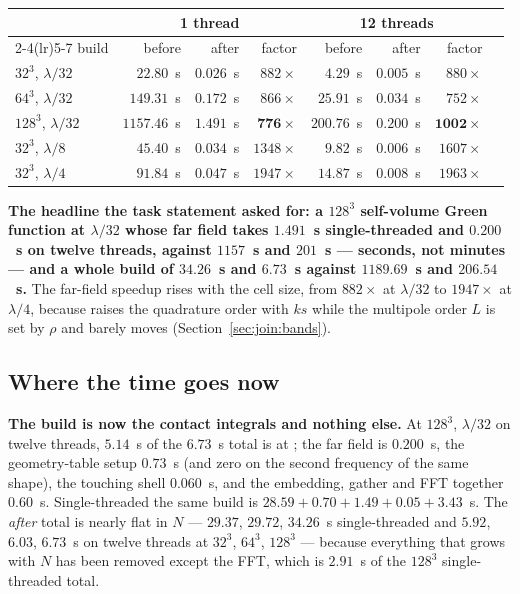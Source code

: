 \begin{center}\footnotesize
\begin{tabular}{@{}lrrrrrrr@{}}
\toprule
& \multicolumn{3}{c}{1 thread} & \multicolumn{3}{c}{12 threads}\\
\cmidrule(lr){2-4}\cmidrule(lr){5-7}
build & before & after & factor & before & after & factor\\
\midrule
$32^3$, $\lambda/32$ & $22.80$~s & $0.026$~s & $882\times$ &
$4.29$~s & $0.005$~s & $880\times$\\
$64^3$, $\lambda/32$ & $149.31$~s & $0.172$~s & $866\times$ &
$25.91$~s & $0.034$~s & $752\times$\\
$128^3$, $\lambda/32$ & $1157.46$~s & $1.491$~s & $\mathbf{776\times}$ &
$200.76$~s & $0.200$~s & $\mathbf{1002\times}$\\
$32^3$, $\lambda/8$ & $45.40$~s & $0.034$~s & $1348\times$ &
$9.82$~s & $0.006$~s & $1607\times$\\
$32^3$, $\lambda/4$ & $91.84$~s & $0.047$~s & $1947\times$ &
$14.87$~s & $0.008$~s & $1963\times$\\
\bottomrule
\end{tabular}
\end{center}

\noindent
\textbf{The headline the task statement asked for: a $128^3$ self-volume Green function at
$\lambda/32$ whose far field takes $1.491$~s single-threaded and $0.200$~s on twelve
threads, against $1157$~s and $201$~s --- seconds, not minutes --- and a whole build of
$34.26$~s and $6.73$~s against $1189.69$~s and $206.54$~s.} The far-field speedup rises
with the cell size, from $882\times$ at $\lambda/32$ to $1947\times$ at $\lambda/4$,
because  raises the quadrature order with $ks$ while the multipole order $L$
is set by $\rho$ and barely moves (Section~\ref{sec:join:bands}).

\subsection{Where the time goes now}
\label{sec:bch:attr}

\textbf{The build is now the contact integrals and nothing else.} At $128^3$, $\lambda/32$
on twelve threads, $5.14$~s of the $6.73$~s total is  at ;
the far field is $0.200$~s, the geometry-table setup $0.73$~s (and zero on the second
frequency of the same shape), the touching shell $0.060$~s, and the embedding, gather and
FFT together $0.60$~s. Single-threaded the same build is $28.59 + 0.70 + 1.49 + 0.05 +
3.43$~s. The \emph{after} total is nearly flat in $N$ --- $29.37$, $29.72$, $34.26$~s
single-threaded and $5.92$, $6.03$, $6.73$~s on twelve threads at $32^3$, $64^3$, $128^3$
--- because everything that grows with $N$ has been removed except the FFT, which is
$2.91$~s of the $128^3$ single-threaded total.

